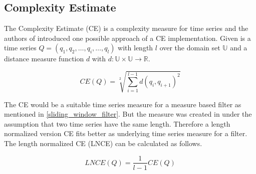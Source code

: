\subsection{Complexity Estimate} \label{complexity_estimate}
The Complexity Estimate (CE) is a complexity measure for time series and the authors of \cite{batista2011complexity}
introduced one possible approach of a CE implementation. Given is a time series $Q = (q_1, q_2, \dots, q_i, \dots, q_l)$
with length $l$ over the domain set $\mathbb{U}$ and a distance measure function $d$ with
$d: \mathbb{U} \times \mathbb{U} \to \mathbb{R}$.

\begin{equation}
    CE(Q) = \sqrt[2]{\sum \limits_{i=1}^{l-1} d(q_i, q_{i + 1})^2}
\end{equation}

The CE would be a suitable time series measure for a measure based filter as mentioned in \ref{sliding_window_filter}.
But the measure was created in \cite{batista2011complexity} under the assumption that two time series have the same
length. Therefore a length normalized version CE fits better as underlying time series measure for a filter. The length
normalized CE (LNCE) can be calculated as follows.

\begin{equation}
    LNCE(Q) = \frac{1}{l-1}CE(Q)
\end{equation}
